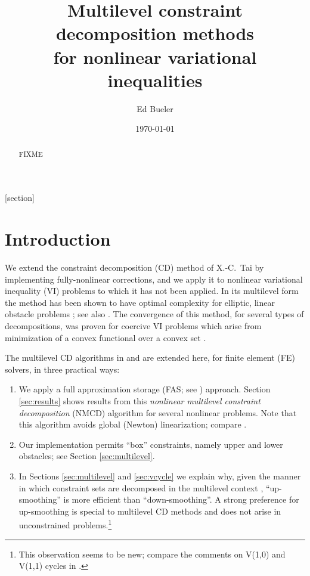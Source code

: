 \documentclass[letterpaper,final,12pt,reqno]{amsart}
\theoremstyle{cstyle}
\theoremstyle{cstyle*}
\theoremstyle{dstyle}
\numberwithin{equation}{section}
\numberwithin{figure}{section}
\numberwithin{table}{section}
\numberwithin{theorem}{section}
\begin{document}
\title[Multilevel constraint decomposition methods]{Multilevel constraint decomposition methods \\ for nonlinear variational inequalities}

\author{Ed Bueler}

\date{\today}

\begin{abstract} FIXME
\end{abstract}

\maketitle


\thispagestyle{empty}

[section]


\section{Introduction} \label{sec:intro}

We extend the constraint decomposition (CD) method of X.-C.~Tai \cite{Tai2003} by implementing fully-nonlinear corrections, and we apply it to nonlinear variational inequality (VI) problems to which it has not been applied.  In its multilevel form the method has been shown to have optimal complexity for elliptic, linear obstacle problems \cite[Subsection 5.4]{Tai2003}; see also \cite[Theorem 4.6 and Algorithm 4.7]{GraeserKornhuber2009}.  The convergence of this method, for several types of decompositions, was proven for coercive VI problems which arise from minimization of a convex functional over a convex set \cite{Tai2003}.

The multilevel CD algorithms in \cite{GraeserKornhuber2009} and \cite{Tai2003} are extended here, for finite element (FE) solvers, in three practical ways:
\renewcommand{\labelenumi}{\emph{(\roman{enumi})}}
\begin{enumerate}
\item We apply a full approximation storage (FAS; see \cite{Brandt1977,Bruneetal2015}) approach.  Section \ref{sec:results} shows results from this \emph{nonlinear multilevel constraint decomposition} (NMCD) algorithm  for several nonlinear problems.  Note that this algorithm avoids global (Newton) linearization; compare \cite{GraeserKornhuber2009}.
\item Our implementation permits ``box'' constraints, namely upper and lower obstacles; see Section \ref{sec:multilevel}.
\item In Sections \ref{sec:multilevel} and \ref{sec:vcycle} we explain why, given the manner in which constraint sets are decomposed in the multilevel context \cite{GraeserKornhuber2009}, ``up-smoothing'' is more efficient than ``down-smoothing''.  A strong preference for up-smoothing is special to multilevel CD methods and does not arise in unconstrained problems.\footnote{This observation seems to be new; compare the comments on V(1,0) and V(1,1) cycles in \cite{GraeserKornhuber2009,Tai2003}.}
\end{enumerate}
\end{document}
